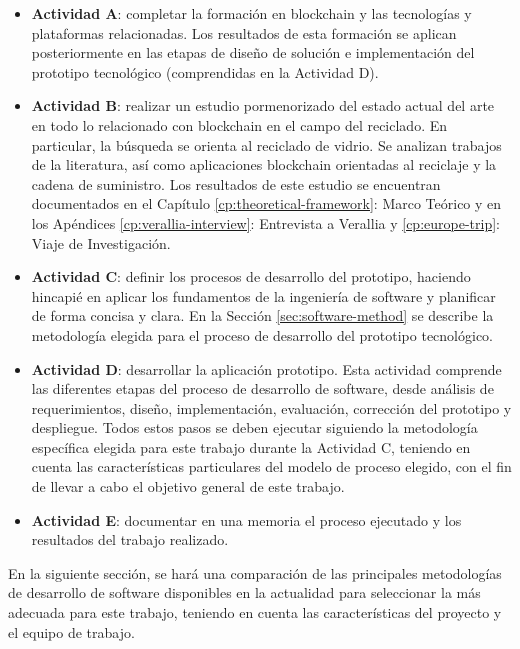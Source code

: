 \begin{itemize}
	\item \textbf{Actividad A}: completar la formación en blockchain y las tecnologías y plataformas relacionadas. Los resultados de esta formación se aplican posteriormente en las etapas de diseño de solución e implementación del prototipo tecnológico (comprendidas en la Actividad D).
	\item \textbf{Actividad B}: realizar un estudio pormenorizado del estado actual del arte en todo lo relacionado con blockchain en el campo del reciclado. En particular, la búsqueda se orienta al reciclado de vidrio. Se analizan trabajos de la literatura, así como aplicaciones blockchain orientadas al reciclaje y la cadena de suministro. Los resultados de este estudio se encuentran documentados en el Capítulo \ref{cp:theoretical-framework}: Marco Teórico y en los Apéndices \ref{cp:verallia-interview}: Entrevista a Verallia y \ref{cp:europe-trip}: Viaje de Investigación.
	\item \textbf{Actividad C}: definir los procesos de desarrollo del prototipo, haciendo hincapié en aplicar los fundamentos de la ingeniería de software y planificar de forma concisa y clara. En la Sección \ref{sec:software-method} se describe la metodología elegida para el proceso de desarrollo del prototipo tecnológico.
	\item \textbf{Actividad D}: desarrollar la aplicación prototipo. Esta actividad comprende las diferentes etapas del proceso de desarrollo de software, desde análisis de requerimientos, diseño, implementación, evaluación, corrección del prototipo y despliegue. Todos estos pasos se deben ejecutar siguiendo la metodología específica elegida para este trabajo durante la Actividad C, teniendo en cuenta las características particulares del modelo de proceso elegido, con el fin de llevar a cabo el objetivo general de este trabajo.
	\item \textbf{Actividad E}: documentar en una memoria el proceso ejecutado y los resultados del trabajo realizado.
\end{itemize}

En la siguiente sección, se hará una comparación de las principales metodologías de desarrollo de software disponibles en la actualidad para seleccionar la más adecuada para este trabajo, teniendo en cuenta las características del proyecto y el equipo de trabajo. 


